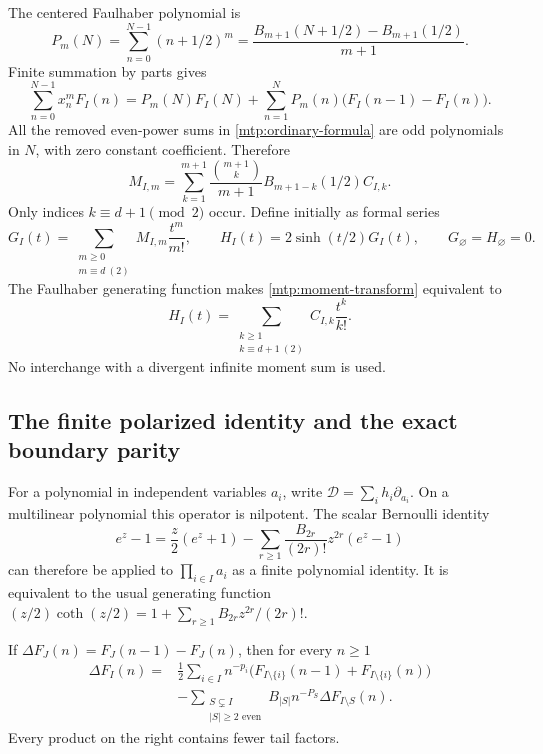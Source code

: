 The centered Faulhaber polynomial is
\[
 P_m(N)=\sum_{n=0}^{N-1}(n+1/2)^m
       =\frac{B_{m+1}(N+1/2)-B_{m+1}(1/2)}{m+1}.
\]
Finite summation by parts gives
\[
 \sum_{n=0}^{N-1}x_n^mF_I(n)
 =P_m(N)F_I(N)+\sum_{n=1}^NP_m(n)\bigl(F_I(n-1)-F_I(n)\bigr).
\]
All the removed even-power sums in \eqref{mtp:ordinary-formula} are odd
polynomials in $N$, with zero constant coefficient. Therefore
\begin{equation}\label{mtp:moment-transform}
 M_{I,m}=\sum_{k=1}^{m+1}
       \frac{\binom{m+1}{k}}{m+1}B_{m+1-k}(1/2)C_{I,k}.
\end{equation}
Only indices $k\equiv d+1\pmod2$ occur. Define initially as formal series
\begin{equation}\label{mtp:GH}
 G_I(t)=\sum_{\substack{m\ge0\\m\equiv d\ (2)}}M_{I,m}\frac{t^m}{m!},
 \qquad H_I(t)=2\sinh(t/2)G_I(t),\qquad G_\varnothing=H_\varnothing=0.
\end{equation}
The Faulhaber generating function makes \eqref{mtp:moment-transform}
equivalent to
\begin{equation}\label{mtp:HC}
 H_I(t)=\sum_{\substack{k\ge1\\k\equiv d+1\ (2)}}C_{I,k}\frac{t^k}{k!}.
\end{equation}
No interchange with a divergent infinite moment sum is used.

\subsection{The finite polarized identity and the exact boundary parity}

For a polynomial in independent variables $a_i$, write
$\mathscr D=\sum_i h_i\partial_{a_i}$. On a multilinear polynomial this
operator is nilpotent. The scalar Bernoulli identity
\[
 e^z-1=\frac z2(e^z+1)
          -\sum_{r\ge1}\frac{B_{2r}}{(2r)!}z^{2r}(e^z-1)
\]
can therefore be applied to $\prod_{i\in I}a_i$ as a finite polynomial
identity. It is equivalent to the usual generating function
$(z/2)\coth(z/2)=1+\sum_{r\ge1}B_{2r}z^{2r}/(2r)!$.

\begin{lemma}
\label{mtp:polarized}
If $\Delta F_J(n)=F_J(n-1)-F_J(n)$, then for every $n\ge1$
\begin{equation}\label{mtp:polarized-formula}
 \boxed{\begin{aligned}
 \Delta F_I(n)={}&\frac12\sum_{i\in I}n^{-p_i}
                         \bigl(F_{I\setminus\{i\}}(n-1)
                              +F_{I\setminus\{i\}}(n)\bigr)\\
 &-\sum_{\substack{S\subsetneq I\\|S|\ge2\text{ even}}}
                   B_{|S|}n^{-P_S}\Delta F_{I\setminus S}(n).
 \end{aligned}}
\end{equation}
Every product on the right contains fewer tail factors.
\end{lemma}

